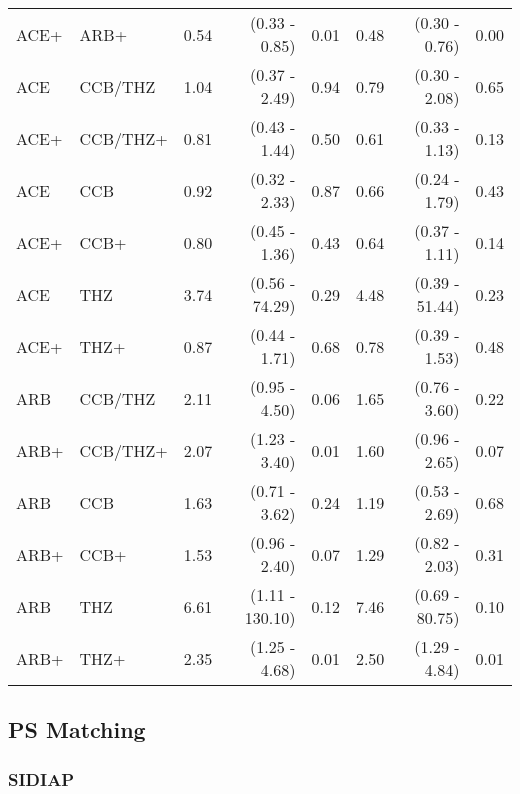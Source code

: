 \documentclass[11pt,]{article}
\begin{document}
\begin{table}[H]
{\begin{tabular}{llrrrrrr}
  ACE+ & ARB+ & 0.54 & (0.33 - 0.85) & 0.01 & 0.48 & (0.30 - 0.76) & 0.00 \\ 
  ACE & CCB/THZ & 1.04 & (0.37 - 2.49) & 0.94 & 0.79 & (0.30 - 2.08) & 0.65 \\ 
  ACE+ & CCB/THZ+ & 0.81 & (0.43 - 1.44) & 0.50 & 0.61 & (0.33 - 1.13) & 0.13 \\ 
  ACE & CCB & 0.92 & (0.32 - 2.33) & 0.87 & 0.66 & (0.24 - 1.79) & 0.43 \\ 
  ACE+ & CCB+ & 0.80 & (0.45 - 1.36) & 0.43 & 0.64 & (0.37 - 1.11) & 0.14 \\ 
  ACE & THZ & 3.74 & (0.56 - 74.29) & 0.29 & 4.48 & (0.39 - 51.44) & 0.23 \\ 
  ACE+ & THZ+ & 0.87 & (0.44 - 1.71) & 0.68 & 0.78 & (0.39 - 1.53) & 0.48 \\ 
  ARB & CCB/THZ & 2.11 & (0.95 - 4.50) & 0.06 & 1.65 & (0.76 - 3.60) & 0.22 \\ 
  ARB+ & CCB/THZ+ & 2.07 & (1.23 - 3.40) & 0.01 & 1.60 & (0.96 - 2.65) & 0.07 \\ 
  ARB & CCB & 1.63 & (0.71 - 3.62) & 0.24 & 1.19 & (0.53 - 2.69) & 0.68 \\ 
  ARB+ & CCB+ & 1.53 & (0.96 - 2.40) & 0.07 & 1.29 & (0.82 - 2.03) & 0.31 \\ 
  ARB & THZ & 6.61 & (1.11 - 130.10) & 0.12 & 7.46 & (0.69 - 80.75) & 0.10 \\ 
  ARB+ & THZ+ & 2.35 & (1.25 - 4.68) & 0.01 & 2.50 & (1.29 - 4.84) & 0.01 \\ 
    \bottomrule
  \end{tabular}
  }
\end{table}

\hypertarget{ps-matching}{%
\subsection{PS Matching}\label{ps-matching}}

\hypertarget{sidiap-3}{%
\subsubsection{SIDIAP}\label{sidiap-3}}
\end{document}
